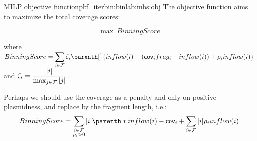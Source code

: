 \begin{definition}{\MBS{} MILP objective function}{pbf_iterbin:binlab:mbs:obj}
  The objective function aims to maximize the total coverage scores:
  \begin{Objective}
    \begin{equation}
      \max ~ BinningScore
      \label{pbf_iterbin:binlab:mbs:obj:max_coverage_score} %
    \end{equation}
  \end{Objective}
  where \(
    \displaystyle BinningScore = %
    \sum_{i \in \Fragments{}} \fzeta{i} \parenth[\big]{ inflow(i) - (\cov{i}\frag{i} - inflow(i)) + \plm{i} inflow(i)}
  \) and \( \displaystyle \zeta_{i} = \frac{ |i| }{ \max_{j \in \mathcal{F}{}} |j| } \).

  \begin{ideabox}
    Perhaps we should use the coverage as a penalty and only on positive plasmidness, and replace \fzeta{} by the fragment length, i.e.:
    \[
      BinningScore =  \sum_{
        \substack{
          i \in \Fragments{} \\
          \plm{i} > 0
        }
      } |i| \parenth*{ inflow(i) - \cov{i} }
      + \sum_{i \in \Fragments{}} |i| \plm{i} inflow(i)
    \]
  \end{ideabox}
\end{definition}